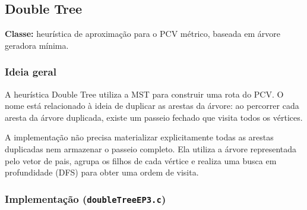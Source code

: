 \documentclass[11pt,a4paper]{article}
\renewcommand{\_}{\underscoreoriginal\allowbreak}
\begin{document}
\subsection{Double Tree}
\label{sec:doubletree}

\textbf{Classe:} heurística de aproximação para o PCV métrico, baseada
em árvore geradora mínima.

\subsubsection*{Ideia geral}

A heurística Double Tree utiliza a MST para construir uma rota do PCV. O
nome está relacionado à ideia de duplicar as arestas da árvore: ao
percorrer cada aresta da árvore duplicada, existe um passeio fechado que
visita todos os vértices.

A implementação não precisa materializar explicitamente todas as arestas
duplicadas nem armazenar o passeio completo. Ela utiliza a árvore
representada pelo vetor de pais, agrupa os filhos de cada vértice e
realiza uma busca em profundidade (DFS) para obter uma ordem de visita.

\subsubsection*{Implementação (\texttt{doubleTreeEP3.c})}
\end{document}
